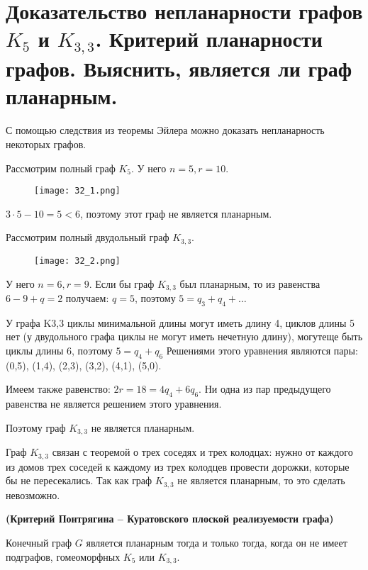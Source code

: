 \section{Доказательство непланарности графов $K_5$ и $K_{3,3}$. Критерий планарности графов. Выяснить, 
является ли граф планарным.}

С помощью следствия из теоремы Эйлера можно доказать непланарность
некоторых графов.

Рассмотрим полный граф $K_5$. У него $n=5, r=10$.
\begin{figure}[h]
    \centering
    \texttt{[image: 32\_1.png]}
\end{figure}

$3 \cdot 5 - 10 = 5 < 6$, поэтому этот граф не является планарным.

Рассмотрим полный двудольный граф $K_{3,3}$.
\begin{figure}[h]
    \centering
    \texttt{[image: 32\_2.png]}
\end{figure}

У него $n=6, r = 9$. Если бы граф $K_{3,3}$ был планарным, то из равенства
$6 - 9 + q = 2$ получаем: $q=5$, поэтому $5 = q_3 + q_4 + \dots$

У графа K3,3 циклы минимальной длины могут иметь длину 4, циклов длины
5 нет (у двудольного графа циклы не могут иметь нечетную длину), могутеще быть циклы длины 6,
поэтому $5 = q_4 + q_6$ Решениями этого уравнения
являются пары: (0,5), (1,4), (2,3), (3,2), (4,1), (5,0).

Имеем также равенство: $2r = 18 = 4q_4 + 6q_6$. Ни одна из пар предыдущего
равенства не является решением этого уравнения.

Поэтому граф $K_{3,3}$ не является планарным.

Граф $K_{3,3}$ связан с теоремой о трех соседях и трех колодцах: нужно от
каждого из домов трех соседей к каждому из трех колодцев провести
дорожки, которые бы не пересекались. Так как граф $K_{3,3}$ не является
планарным, то это сделать невозможно.

\begin{theorem}
    \textbf{(Критерий Понтрягина -- Куратовского плоской реализуемости
графа)}

    Конечный граф $G$ является планарным тогда и только тогда, когда он не имеет
    подграфов, гомеоморфных $K_5$ или $K_{3,3}$.
\end{theorem}
